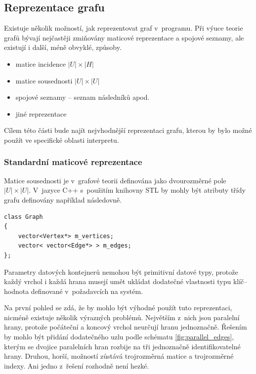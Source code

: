 \documentclass[11pt,twoside,a4paper]{book}
\begin{document}
\subsection{Reprezentace grafu}

Existuje několik možností, jak reprezentovat graf v~programu. Při výuce teorie grafů bývají nejčastěji zmi\-ňo\-vá\-ny maticové reprezentace a spojové seznamy, ale existují i další, méně obvyklé, způsoby.

\begin{itemize}
\item matice incidence $|U| \times |H|$
\item matice sousednosti $|U| \times |U|$
\item spojové seznamy -- seznam následníků apod.
\item jiné reprezentace
\end{itemize}

Cílem této části bude najít nejvhodnější reprezentaci grafu, kterou by bylo možné použít ve specifické oblasti interpretu.


\subsubsection{Standardní maticové reprezentace}

Matice sousednosti je v~grafové teorii definována jako dvourozměrné pole $|U| \times |U|$. V~jazyce C++ s~použitím knihovny STL by mohly být atributy třídy grafu definovány například následovně.

\begin{verbatim}
class Graph
{
    vector<Vertex*> m_vertices;
    vector< vector<Edge*> > m_edges;
};
\end{verbatim}

Parametry datových kontejnerů nemohou být primitivní datové typy, protože každý vrchol i každá hrana musejí umět ukládat dodatečné vlastnosti typu klíč--hodnota definované v~požadavcích na systém.

Na první pohled se zdá, že by mohlo být výhodné použít tuto reprezentaci, nicméně existuje několik výrazných problémů. Největším z~nich jsou paralelní hrany, protože počáteční a koncový vrchol neurčují hranu jednoznačně. Řešením by mohlo být přidání dodatečného uzlu podle schématu \ref{fig:parallel_edges}, kterým se dvojice paralelních hran rozbije na tři jednoznačně identifikovatelné hrany. Druhou, horší, možností zůstává trojrozměrná matice a trojrozměrné indexy. Ani jedno z~řešení rozhodně není hezké.
\end{document}
